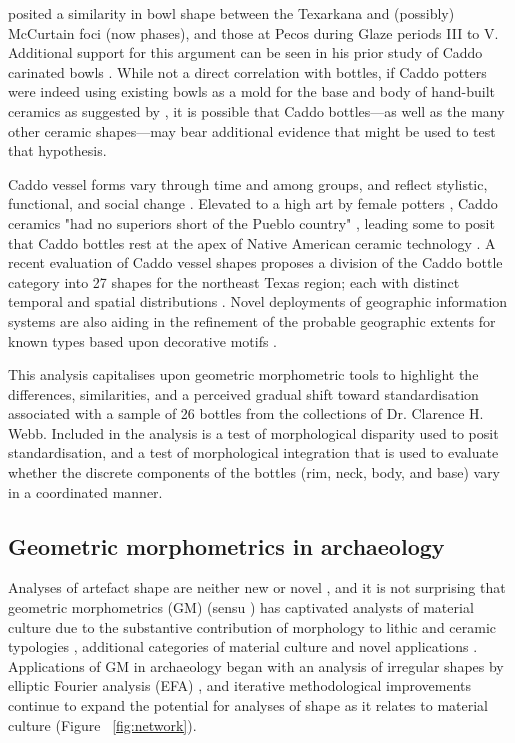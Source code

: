 \documentclass[review]{elsarticle}
\begin{document}
\citet[147]{RN4774} posited a similarity in bowl shape between the Texarkana and (possibly) McCurtain foci (now phases), and those at Pecos during Glaze periods III to V. Additional support for this argument can be seen in his prior study of Caddo carinated bowls \citep[221-247]{RN2518}. While not a direct correlation with bottles, if Caddo potters were indeed using existing bowls as a mold for the base and body of hand-built ceramics as suggested by \citet{RN2151}, it is possible that Caddo bottles---as well as the many other ceramic shapes---may bear additional evidence that might be used to test that hypothesis.

Caddo vessel forms vary through time and among groups, and reflect stylistic, functional, and social change \citep{RN1986}. Elevated to a high art by female potters \citep{RN491}, Caddo ceramics "had no superiors short of the Pueblo country" \citep[239]{RN491}, leading some to posit that Caddo bottles rest at the apex of Native American ceramic technology \citep{RN4770}. A recent evaluation of Caddo vessel shapes proposes a division of the Caddo bottle category into 27 shapes for the northeast Texas region; each with distinct temporal and spatial distributions \citep[Figure 2]{RN11636}. Novel deployments of geographic information systems are also aiding in the refinement of the probable geographic extents for known types based upon decorative motifs \citep{RN2674}.

This analysis capitalises upon geometric morphometric tools to highlight the differences, similarities, and a perceived gradual shift toward standardisation associated with a sample of 26 bottles from the collections of Dr. Clarence H. Webb. Included in the analysis is a test of morphological disparity \citep{RN11696} used to posit standardisation, and a test of morphological integration \citep{RN11700} that is used to evaluate whether the discrete components of the bottles (rim, neck, body, and base) vary in a coordinated manner.

\subsection{Geometric morphometrics in archaeology}

Analyses of artefact shape are neither new or novel \citep{RN11779}, and it is not surprising that geometric morphometrics (GM) (sensu \citet{RN11559}) has captivated analysts of material culture due to the substantive contribution of morphology to lithic \citep{RN11529,RN11528,RN11534} and ceramic typologies \citep{RN1752,RN11631,RN4335}, additional categories of material culture \citep{RN1737,RN4374,RN11527} and novel applications \citep{RN11543,RN11544}. Applications of GM in archaeology began with an analysis of irregular shapes by elliptic Fourier analysis (EFA) \citep{RN4379}, and iterative methodological improvements continue to expand the potential for analyses of shape as it relates to material culture (Figure ~\ref{fig:network}).
\end{document}
